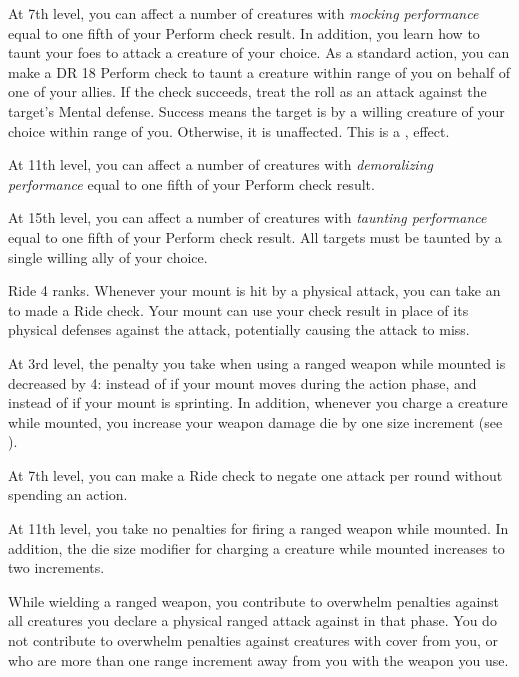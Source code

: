     At 7th level, you can affect a number of creatures with \textit{mocking performance} equal to one fifth of your Perform check result.
    In addition, you learn how to taunt your foes to attack a creature of your choice.
     As a standard action, you can make a DR 18 Perform check to taunt a creature within \rngmed range of you on behalf of one of your allies.
    If the check succeeds, treat the roll as an attack against the target's Mental defense.
    Success means the target is \taunted by a willing creature of your choice within \rngmed range of you.
    Otherwise, it is unaffected.
    This is a ,  effect.

    At 11th level, you can affect a number of creatures with \textit{demoralizing performance} equal to one fifth of your Perform check result.

    At 15th level, you can affect a number of creatures with \textit{taunting performance} equal to one fifth of your Perform check result.
    All targets must be taunted by a single willing ally of your choice.

    \featpre Ride 4 ranks.
    \featben Whenever your mount is hit by a physical attack, you can take an  to made a Ride check.
    Your mount can use your check result in place of its physical defenses against the attack, potentially causing the attack to miss.

    At 3rd level, the penalty you take when using a ranged weapon while mounted is decreased by 4:  instead of  if your mount moves during the action phase, and  instead of  if your mount is sprinting.
    In addition, whenever you charge a creature while mounted, you increase your weapon damage die by one size increment (see ).

    At 7th level, you can make a Ride check to negate one attack per round without spending an action.

    At 11th level, you take no penalties for firing a ranged weapon while mounted.
    In addition, the die size modifier for charging a creature while mounted increases to two increments.

    \featben While wielding a ranged weapon, you contribute to overwhelm penalties against all creatures you declare a physical ranged attack against in that phase.
    You do not contribute to overwhelm penalties against creatures with cover from you, or who are more than one range increment away from you with the weapon you use.

